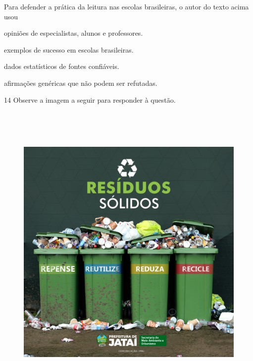 
Para defender a prática da leitura nas escolas brasileiras, o autor do texto 
acima usou 

\begin{escolha}

    \item opiniões de especialistas, alunos e professores.

    \item exemplos de sucesso em escolas brasileiras. 

    \item dados estatísticos de fontes confiáveis.

    \item afirmações genéricas que não podem ser refutadas. 

\end{escolha}

\pagebreak

\num{14} Observe a imagem a seguir para responder à questão.

\begin{figure}[H]
\includegraphics[width=5.90551in,height=5.90278in]{./imgSAEB_7_POR/media/image19.png}
\end{figure}

